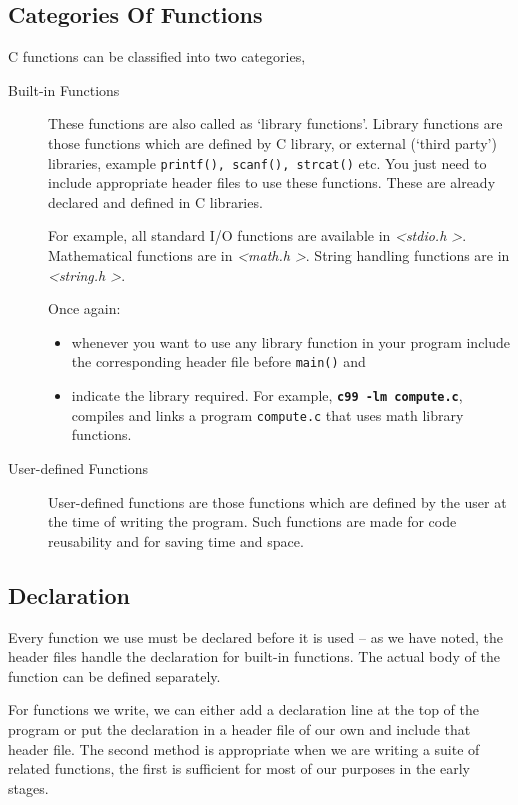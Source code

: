 \documentclass[11pt,a4paper]{article}
\begin{document}
\subsection*{Categories Of Functions}
C functions can be classified into two categories,
\begin{description}
\item [Built-in Functions]
These functions are also called as `library functions'. Library functions are those functions which are defined by C library, or external (`third party') libraries, example \texttt{printf(), scanf(), strcat()} etc. You just need to include appropriate header files to use these functions. These are already declared and defined in C libraries.

For example, all standard I/O functions are available in \emph{\textless stdio.h \textgreater}. Mathematical functions are in \emph{\textless math.h \textgreater}. 
String handling functions are in \emph{\textless string.h \textgreater}.

Once again:
\begin{itemize}
  \item whenever you want to use any library function in your program include the corresponding header file before \texttt{main()} and
  \item indicate the library required. For example, \textbf{\texttt{c99 -lm compute.c}}, compiles and links a program \texttt{compute.c} that uses  math library functions.  
\end{itemize}

\item [User-defined Functions]
User-defined functions are those functions which are defined by the user at the time of writing the program. Such functions are made for code reusability and for saving time and space.
\end{description}

\subsection*{Declaration} 

Every function we use must be declared before it is used -- as we have noted, the header files handle the declaration for built-in functions. The actual body of the function can be defined separately. 

For functions we write, we can either add a declaration line at the top of the program or put the declaration in a header file of our own and include that header file. The second method is appropriate when we are writing a suite of related functions, the first is sufficient for most of our purposes in the early stages. 
\end{document}
